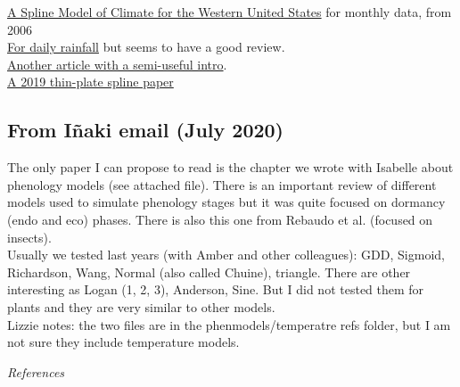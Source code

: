 \documentclass[11pt,letter]{article}
\begin{document}
\href{https://www.fs.fed.us/rm/pubs/rmrs_gtr165.pdf}{A Spline Model of Climate for the
Western United States} for monthly data, from 2006\\

\href{https://rmets.onlinelibrary.wiley.com/doi/pdf/10.1002/joc.4068}{For daily rainfall} but seems to have a good review. \\

\href{https://agupubs.onlinelibrary.wiley.com/doi/full/10.1002/2013JD020803}{Another article with a semi-useful intro}.\\

\href{https://www.nature.com/articles/sdata2018299}{A 2019 thin-plate spline paper}

\subsection{From I\~naki email (July 2020)}

The only paper I can propose to read is the chapter we wrote with Isabelle about phenology models (see attached file). There is an important review of different models used to simulate phenology stages  but it was quite focused on dormancy (endo and eco) phases. 
There is also this one from Rebaudo et al. (focused on insects).\\

Usually we tested last years (with Amber and other colleagues): GDD, Sigmoid, Richardson, Wang, Normal (also called Chuine), triangle. 
There are other interesting as Logan (1, 2, 3), Anderson, Sine. But I did not tested them for plants and they are very similar to other models. \\

Lizzie notes: the two files are in the phenmodels/temperatre refs folder, but I am not sure they include temperature models.


\renewcommand{\refname}{\CHead{}}

\emph{References}

\end{document}
